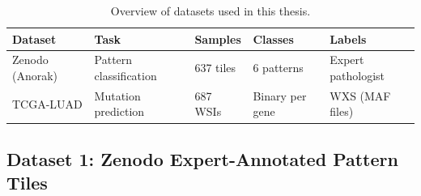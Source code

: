\begin{table}[ht!]
\centering
\caption{Overview of datasets used in this thesis.}
\label{tab:datasets_overview}
\begin{tabular}{p{3.5cm} p{2.5cm} p{2cm} p{2cm} p{3cm}}
\hline
\textbf{Dataset} & \textbf{Task} & \textbf{Samples} & \textbf{Classes} & \textbf{Labels} \\
\hline
Zenodo (Anorak) & Pattern classification & 637 tiles & 6 patterns & Expert pathologist \\
TCGA-LUAD & Mutation prediction & 687 WSIs & Binary per gene & WXS (MAF files) \\
\hline
\end{tabular}
\end{table}

\begin{table}[ht!]
\centering
\small
\caption{Tensor-level data shape consumed by each artefact.
``Sample'' means one independent unit of supervision; ``Bag'' means a
variable-size set of tiles drawn from the same WSI.
$N_s \in [\,5\,000, 80\,000\,]$ is the per-slide tile count.}
\label{tab:data_shape}
\end{table}


\subsection{Dataset 1: Zenodo Expert-Annotated Pattern Tiles}
\label{sec:uc:zenodo}

